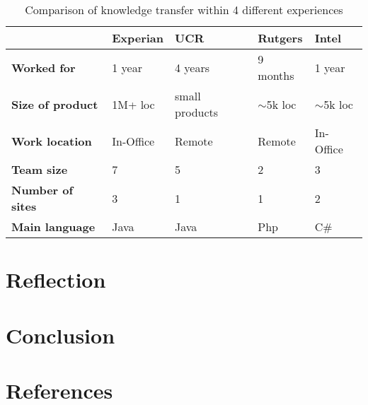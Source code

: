 \documentclass[12pt, letterpaper]{article}
\begin{document}
\begin{table}[] 
\centering
\caption{Comparison of knowledge transfer within 4 different experiences}
\label{comparisonTable}
\begin{tabular}{|l|l|l|l|l|}
\hline
                         & \textbf{Experian} & \textbf{UCR}   & \textbf{Rutgers} & \textbf{Intel} \\ \hline
\textbf{Worked for}      & 1 year            & 4 years        & 9 months         & 1 year         \\ \hline
\textbf{Size of product} & 1M+ loc           & small products & $\sim$5k loc     & $\sim$5k loc   \\ \hline
\textbf{Work location}   & In-Office         & Remote         & Remote           & In-Office      \\ \hline
\textbf{Team size}       & 7                 & 5              & 2                & 3              \\ \hline
\textbf{Number of sites} & 3                 & 1              & 1                & 2              \\ \hline
\textbf{Main language}   & Java              & Java           & Php              & C\#            \\ \hline
\end{tabular}
\end{table}

\section{Reflection}

\section{Conclusion}

\section{References} 
 
\end{document}
